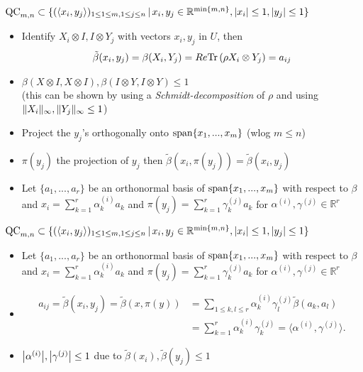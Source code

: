 \begin{frame}
	\begin{exampleblock}{$ \textup{QC}_{m,n} \subset \{ (\langle x_i,y_j \rangle)_{1 \le 1 \le m, 1 \le j \le n} \,| \, x_i,y_j \in \mathbb{R}^{ \min \{m,n \} }, \vert x_i  \vert \le 1, \vert y_j \vert \le 1  \} $}
		\begin{itemize}
			\item Identify $ X_i \otimes I,I \otimes Y_j $ with vectors $ x_i,y_j $ in $ U $, then 
			\begin{align*}
			\tilde{\beta}(x_i,y_j) = \beta(X_i,Y_j) = Re \text{Tr} \, {(\rho X_i \otimes Y_j)}  = a_{ij}
			\end{align*}
			\item $ \beta (X \otimes I, X \otimes I), \beta (I \otimes Y, I \otimes Y) \le 1$ \\
			(this can be shown by using a {\itshape Schmidt-decomposition} of $ \rho $ and using $  \Vert {X_i} \Vert_{\infty},  \Vert {Y_j} \Vert_{\infty} \le 1 $)
			\item Project the $ y_j $'s orthogonally onto $ \textup{span} \{ x_1,...,x_m \} $  (wlog $ m \le n $)
			\item $ \pi(y_j) $ the projection of $ y_j $ then $ \tilde{\beta}(x_i,\pi(y_j)) = \tilde{\beta}(x_i,y_j) $
			\item Let $ \{a_1,...,a_r\} $ be an orthonormal basis of $ \textup{span} \{ x_1,...,x_m \} $ with respect to $ \beta $ and 
			$ x_i = \sum_{k=1}^{r}\alpha_k^{(i)}a_k$ and $  \pi(y_j) = \sum_{k=1}^r \gamma_k^{(j)} a_k$ for $ \alpha^{(i)}, \gamma^{(j)} \in \mathbb{R}^r $
		\end{itemize}
		
	\end{exampleblock}
\end{frame}

\begin{frame}
	\begin{exampleblock}{$ \textup{QC}_{m,n} \subset \{ (\langle x_i,y_j \rangle)_{1 \le 1 \le m, 1 \le j \le n} \,| \, x_i,y_j \in \mathbb{R}^{ \min \{m,n \} }, \vert x_i  \vert \le 1, \vert y_j \vert \le 1  \} $}
		\begin{itemize}
			\item Let $ \{a_1,...,a_r\} $ be an orthonormal basis of $ \textup{span} \{ x_1,...,x_m \} $ with respect to $ \beta $ and 
			$ x_i = \sum_{k=1}^{r}\alpha_k^{(i)}a_k$ and $  \pi(y_j) = \sum_{k=1}^r \gamma_k^{(j)} a_k$ for $ \alpha^{(i)}, \gamma^{(j)} \in \mathbb{R}^r $
			\item \begin{align*}
			a_{ij}= \tilde{\beta}(x_i,y_j)= \tilde{\beta}(x,\pi(y)) &= \sum_{1 \le k,l \le r} \alpha_k^{(i)} \gamma_l^{(j)} \tilde{\beta}(a_k,a_l) \\
			&= \sum_{k=1}^{r}\alpha_k^{(i)}\gamma_k^{(j)} = \langle \alpha^{(i)}, \gamma^{(j)} \rangle.
			\end{align*}
			\item $ {\left|{\alpha^{(i)}}\right|}, {\left|{\gamma^{(j)}}\right|} \le 1  $ due to $ \tilde{\beta}(x_i), \tilde{\beta}(y_j) \le 1 $
		\end{itemize}
	\end{exampleblock}
\end{frame}

